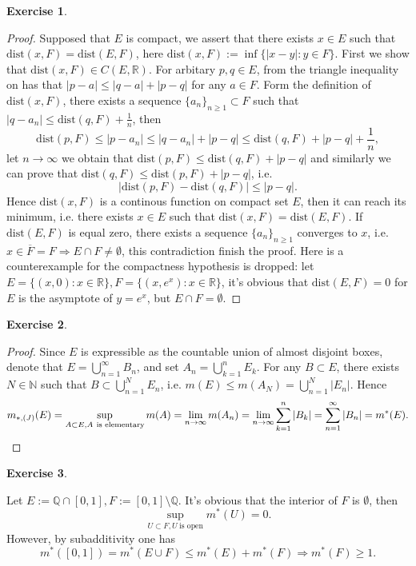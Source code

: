 \documentclass{article}
\newtheorem{ex}{Exercise}[subsection]
\begin{document}
\begin{ex}\end{ex}
\begin{proof}
Supposed that $E$ is compact, we assert that there exists $x \in E$ such that $\mathrm{dist}(x, F) = \mathrm{dist}(E, F)$,
here $\mathrm{dist}(x, F) := \inf \{|x - y| : y \in F\}$. First we show that $\mathrm{dist}(x, F) \in C(E, \mathbb{R})$.
For arbitary $p, q \in E$, from the triangle inequality on has that $|p - a| \leq |q - a| + |p - q|$ for any $a \in F$.
Form the definition of $\mathrm{dist}(x, F)$, there exists a sequence $\{a_n\}_{n \geq 1} \subset F$ such that 
$|q - a_n| \leq \mathrm{dist}(q, F) + \frac{1}{n}$, then $$
\mathrm{dist}(p, F) \leq |p - a_n| \leq |q - a_n| + |p - q| \leq \mathrm{dist}(q, F) + |p - q| + \frac{1}{n},
$$let $n \to \infty$ we obtain that $\mathrm{dist}(p, F) \leq \mathrm{dist}(q, F) + |p - q|$ and similarly we can 
prove that $\mathrm{dist}(q, F) \leq \mathrm{dist}(p, F) + |p - q|$, i.e.$$
|\mathrm{dist}(p, F) - \mathrm{dist}(q, F)| \leq |p - q|.
$$
Hence $\mathrm{dist}(x, F)$ is a continous function on compact set $E$, then it can reach its minimum, i.e. there
exists $x \in E$ such that $\mathrm{dist}(x, F) = \mathrm{dist}(E, F)$. If $\mathrm{dist}(E, F)$ is equal zero, 
there exists a sequence $\{a_n\}_{n \geq 1}$ converges to $x$, i.e. $x \in \overline{F} = F \Rightarrow E \cap F \not= \emptyset$,
this contradiction finish the proof. Here is a counterexample for the compactness hypothesis is dropped: let
$E = \{(x, 0) : x \in \mathbb{R}\}, F = \{(x, e^x) : x \in \mathbb{R}\}$, it's obvious that $\mathrm{dist}(E, F) = 0$
for $E$ is the asymptote of $y = e^x$, but $E \cap F = \emptyset$.
\end{proof}

\begin{ex}\end{ex}
\begin{proof}
Since $E$ is expressible as the countable union of almost disjoint boxes, denote that $E = \bigcup_{n = 1}^\infty B_n$,
and set $A_n = \bigcup_{k = 1}^n E_k$. For any $B \subset E$, there exists $N \in \mathbb{N}$ such that 
$B \subset \bigcup_{n = 1}^N E_n$, i.e. $m(E) \leq m(A_N) = \bigcup_{n = 1}^N |E_n|$. Hence\[
m_{*,(J)}(E) = \sup_{A \subset E, A\ \text{is elementary}} m(A) = \lim_{n \to \infty} m(A_n) = \lim_{n \to \infty}
\sum_{k = 1}^n |B_k| = \sum_{n = 1}^\infty |B_n| = m^*(E). \qedhere
\]
\end{proof}

\begin{ex}\end{ex}
Let $E := \mathbb{Q} \cap [0, 1], F := [0, 1] \setminus \mathbb{Q}$. It's obvious that the interior of $F$ is $\emptyset$,
then $$\sup_{U \subset F, U\ \text{is open}} m^*(U) = 0.$$ However, by subadditivity one has \[
m^*([0, 1]) = m^*(E \cup F) \leq m^*(E) + m^*(F) \Rightarrow m^*(F) \geq 1.
\]
\end{document}
